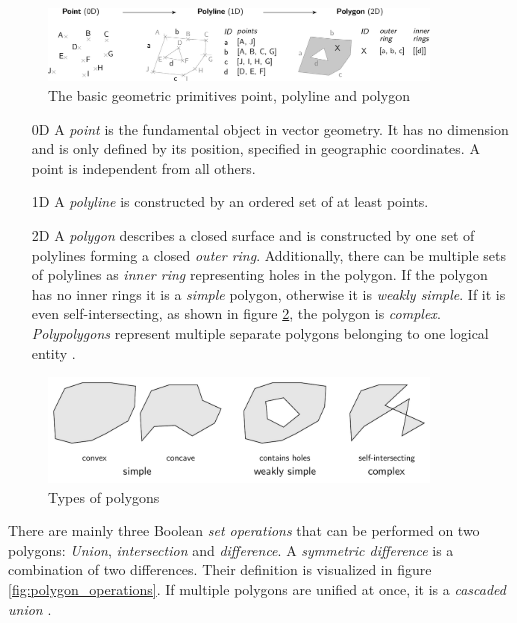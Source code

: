 \begin{figure}[H]
  \vspace{1em}
  \centering
  \includegraphics[width=0.9\textwidth]{graphics/basics/hgis/geometric_primitives}
  \caption{The basic geometric primitives point, polyline and polygon}
  \label{fig:geometric_primitives}
\end{figure}

\begin{enumerate}
  \item[0D] A \emph{point} is the fundamental object in vector geometry. It has no dimension and is only defined by its position, specified in geographic coordinates. A point is independent from all others.
  \item[1D] A \emph{polyline} is constructed by an ordered set of at least points.
  \item[2D] A \emph{polygon} describes a closed surface and is constructed by one set of polylines forming a closed \emph{outer ring}. Additionally, there can be multiple sets of polylines as \emph{inner ring} representing holes in the polygon. If the polygon has no inner rings it is a \emph{simple} polygon, otherwise it is \emph{weakly simple}. If it is even self-intersecting, as shown in figure \ref{fig:polygon_properties}, the polygon is \emph{complex}. \emph{Polypolygons} represent multiple separate polygons belonging to one logical entity \cite{polygons}.
\end{enumerate}

\begin{figure}[H]
  \centering
  \includegraphics[width=0.9\textwidth]{graphics/basics/hgis/polygon_properties}
  \caption{Types of polygons}
  \label{fig:polygon_properties}
\end{figure}

There are mainly three Boolean \emph{set operations} that can be performed on two polygons: \emph{Union}, \emph{intersection} and \emph{difference}. A \emph{symmetric difference} is a combination of two differences. Their definition is visualized in figure \ref{fig:polygon_operations}.
If multiple polygons are unified at once, it is a \emph{cascaded union}
\cite{bolstad2008gis}.

